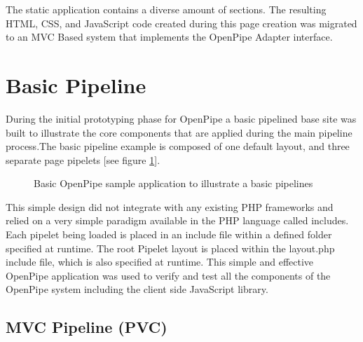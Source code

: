 \documentclass[12pt]{report}
\begin{document}
The static application contains a diverse amount of sections. The resulting HTML, CSS, and JavaScript code created during this page creation was migrated to an MVC Based system that implements the OpenPipe Adapter interface.


\section{Basic Pipeline}

During the initial prototyping phase for OpenPipe a basic pipelined base site was built to illustrate the core components that are applied during the main pipeline process.The basic pipeline example is composed of one default layout, and three separate page pipelets [see figure \ref{fig:basicPipeline}]. 

\begin{figure}[H]
\label{fig:basicPipeline}
\centering
{}
\caption{Basic OpenPipe sample application to illustrate a basic pipelines}
\end{figure}

This simple design did not integrate with any existing PHP frameworks and relied on a very simple paradigm available in the PHP language called includes. Each pipelet being loaded is placed in an include file within a defined folder specified at runtime. The root Pipelet layout is placed within the layout.php include file,	 which is also specified at runtime. This simple and effective OpenPipe application was used to verify and test all the components of the OpenPipe system including the client side JavaScript library. 


\subsection{MVC Pipeline (PVC)}
\end{document}
